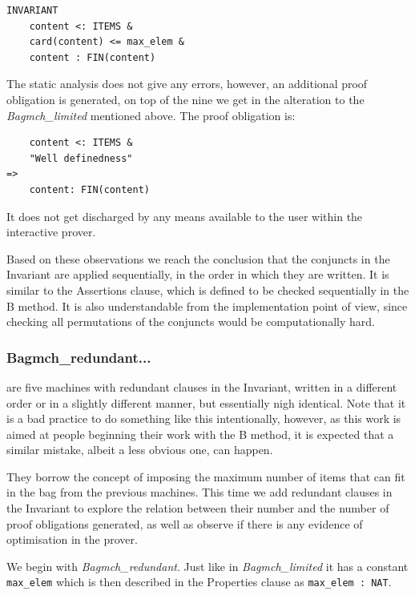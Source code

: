 \documentclass[12pt,journal,duplex]{IEEEtran}
\begin{document}
\begin{lstlisting}
INVARIANT
	content <: ITEMS &
	card(content) <= max_elem &
	content : FIN(content)
\end{lstlisting}

	The static analysis does not give any errors, however, an additional proof obligation is generated, on top of the nine we get in the alteration to the \emph{Bagmch\_limited} mentioned above. The proof obligation is:

\begin{lstlisting}
   	content <: ITEMS &
	"Well definedness"
=>
	content: FIN(content)
\end{lstlisting}

	It does not get discharged by any means available to the user within the interactive prover.

	Based on these observations we reach the conclusion that the conjuncts in the Invariant are applied sequentially, in the order in which they are written. It is similar to the Assertions clause, which is defined to be checked sequentially in the B method. It is also understandable from the implementation point of view, since checking all permutations of the conjuncts would be computationally hard.

	\subsubsection{Bagmch\_redundant...} are five machines with redundant clauses in the Invariant, written in a different order or in a slightly different manner, but essentially nigh identical. Note that it is a bad practice to do something like this intentionally, however, as this work is aimed at people beginning their work with the B method, it is expected that a similar mistake, albeit a less obvious one, can happen.

	They borrow the concept of imposing the maximum number of items that can fit in the bag from the previous machines. This time we add redundant clauses in the Invariant to explore the relation between their number and the number of proof obligations generated, as well as observe if there is any evidence of optimisation in the prover.

	We begin with \emph{Bagmch\_redundant}. Just like in \emph{Bagmch\_limited} it has a constant \texttt{max\_elem} which is then described in the Properties clause as \texttt{max\_elem : NAT}.
\end{document}
